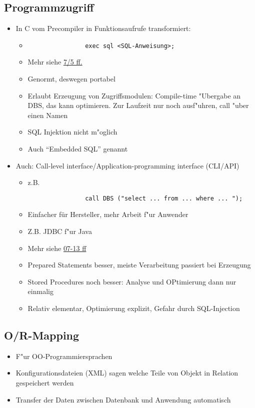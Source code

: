 \documentclass[a4paper, 12pt]{scrartcl}
\begin{document}
\subsection{Programmzugriff}
\begin{itemize}
	\item
		In C vom Precompiler in Funktionsaufrufe transformiert:
		\begin{itemize}
			\item
				\begin{lstlisting}
				exec sql <SQL-Anweisung>;
				\end{lstlisting}
			\item
				Mehr siehe \href{site:IDB-2015WS-07-Programmzugriff.pdf}{7/5 ff.}
			\item
				Genormt, deswegen portabel
			\item
				Erlaubt Erzeugung von Zugriffsmodulen: Compile-time "Ubergabe an DBS, das kann optimieren. Zur Laufzeit nur noch ausf"uhren, call "uber einen Namen
			\item
				SQL Injektion nicht m"oglich
			\item
				Auch \enquote{Embedded SQL} genannt
		\end{itemize}
	\item
		Auch: Call-level interface/Application-programming interface (CLI/API)
		\begin{itemize}
			\item
				z.B.
				\begin{lstlisting}
				call DBS ("select ... from ... where ... ");
				\end{lstlisting}
			\item
				Einfacher für Hersteller, mehr Arbeit f"ur Anwender
			\item
				Z.B. JDBC f"ur Java
			\item
				Mehr siehe \href{site:IDB-2015WS-07-Programmzugriff.pdf}{07-13 ff}
			\item
				Prepared Statements besser, meiste Verarbeitung passiert bei Erzeugung
			\item
				Stored Procedures noch besser: Analyse und OPtimierung dann nur einmalig
			\item
				Relativ elementar, Optimierung explizit, Gefahr durch SQL-Injection
		\end{itemize}


\end{itemize}


\subsection{O/R-Mapping}
\begin{itemize}
	\item
		F"ur OO-Programmiersprachen
	\item
		Konfigurationsdateien (XML) sagen welche Teile von Objekt in Relation gespeichert werden
	\item
		Transfer der Daten zwischen Datenbank und Anwendung automatisch
\end{itemize}
\end{document}
